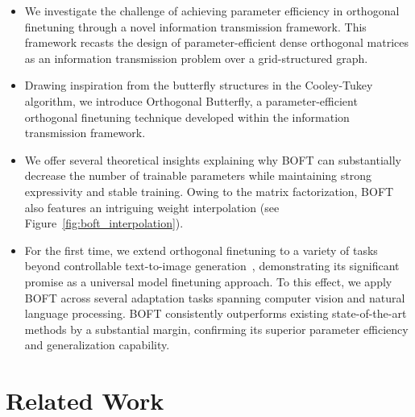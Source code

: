\begin{itemize}[leftmargin=*,nosep]
    \item We investigate the challenge of achieving parameter efficiency in orthogonal finetuning through a novel information transmission framework. This framework recasts the design of parameter-efficient dense orthogonal matrices as an information transmission problem over a grid-structured graph.
    \item Drawing inspiration from the butterfly structures in the Cooley-Tukey algorithm, we introduce Orthogonal Butterfly, a parameter-efficient orthogonal finetuning technique developed within the information transmission framework.
    \item We offer several theoretical insights explaining why BOFT can substantially decrease the number of trainable parameters while maintaining strong expressivity and stable training. Owing to the matrix factorization, BOFT also features an intriguing weight interpolation (see Figure~\ref{fig:boft_interpolation}).
    \item For the first time, we extend orthogonal finetuning to a variety of tasks beyond controllable text-to-image generation~\cite{qiu2023controlling}, demonstrating its significant promise as a universal model finetuning approach. To this effect, we apply BOFT across several adaptation tasks spanning computer vision and natural language processing. BOFT consistently outperforms existing state-of-the-art methods by a substantial margin, confirming its superior parameter efficiency and generalization capability.
\end{itemize}

\section{Related Work}

